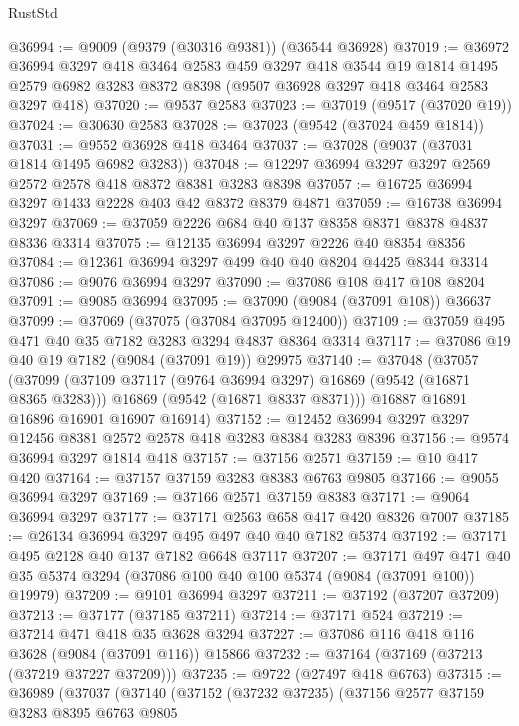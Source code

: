 \begin{lexlean}{RustStd}
\begin{coremodule}
@36994 := @9009 (@9379 (@30316 @9381)) (@36544 @36928)
@37019 := @36972
    @36994
    @3297
    @418
    @3464
    @2583
    @459
    @3297
    @418
    @3544
    @19
    @1814
    @1495
    @2579
    @6982
    @3283
    @8372
    @8398
    (@9507 @36928 @3297 @418 @3464 @2583 @3297 @418)
@37020 := @9537 @2583
@37023 := @37019 (@9517 (@37020 @19))
@37024 := @30630 @2583
@37028 := @37023 (@9542 (@37024 @459 @1814))
@37031 := @9552 @36928 @418 @3464
@37037 := @37028 (@9037 (@37031 @1814 @1495 @6982 @3283))
@37048 := @12297 @36994 @3297 @3297 @2569 @2572 @2578 @418 @8372 @8381 @3283 @8398
@37057 := @16725 @36994 @3297 @1433 @2228 @403 @42 @8372 @8379 @4871
@37059 := @16738 @36994 @3297
@37069 := @37059 @2226 @684 @40 @137 @8358 @8371 @8378 @4837 @8336 @3314
@37075 := @12135 @36994 @3297 @2226 @40 @8354 @8356
@37084 := @12361 @36994 @3297 @499 @40 @40 @8204 @4425 @8344 @3314
@37086 := @9076 @36994 @3297
@37090 := @37086 @108 @417 @108 @8204
@37091 := @9085 @36994
@37095 := @37090 (@9084 (@37091 @108)) @36637
@37099 := @37069 (@37075 (@37084 @37095 @12400))
@37109 := @37059 @495 @471 @40 @35 @7182 @3283 @3294 @4837 @8364 @3314
@37117 := @37086 @19 @40 @19 @7182 (@9084 (@37091 @19)) @29975
@37140 := @37048
    (@37057
      (@37099
        (@37109 @37117 (@9764 @36994 @3297) @16869 (@9542 (@16871 @8365 @3283)))
        @16869
        (@9542 (@16871 @8337 @8371)))
      @16887
      @16891
      @16896
      @16901
      @16907
      @16914)
@37152 := @12452 @36994 @3297 @3297 @12456 @8381 @2572 @2578 @418 @3283 @8384 @3283 @8396
@37156 := @9574 @36994 @3297 @1814 @418
@37157 := @37156 @2571
@37159 := @10 @417 @420
@37164 := @37157 @37159 @3283 @8383 @6763 @9805
@37166 := @9055 @36994 @3297
@37169 := @37166 @2571 @37159 @8383
@37171 := @9064 @36994 @3297
@37177 := @37171 @2563 @658 @417 @420 @8326 @7007
@37185 := @26134 @36994 @3297 @495 @497 @40 @40 @7182 @5374
@37192 := @37171 @495 @2128 @40 @137 @7182 @6648 @37117
@37207 := @37171
    @497
    @471
    @40
    @35
    @5374
    @3294
    (@37086 @100 @40 @100 @5374 (@9084 (@37091 @100)) @19979)
@37209 := @9101 @36994 @3297
@37211 := @37192 (@37207 @37209)
@37213 := @37177 (@37185 @37211)
@37214 := @37171 @524
@37219 := @37214 @471 @418 @35 @3628 @3294
@37227 := @37086 @116 @418 @116 @3628 (@9084 (@37091 @116)) @15866
@37232 := @37164 (@37169 (@37213 (@37219 @37227 @37209)))
@37235 := @9722 (@27497 @418 @6763)
@37315 := @36989
    (@37037
      (@37140
        (@37152
          (@37232 @37235)
          (@37156
            @2577
            @37159
            @3283
            @8395
            @6763
            @9805

\end{coremodule}
\end{lexlean}
